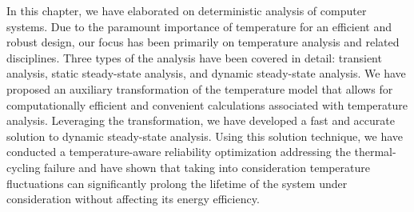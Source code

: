 In this chapter, we have elaborated on deterministic analysis of computer
systems. Due to the paramount importance of temperature for an efficient and
robust design, our focus has been primarily on temperature analysis and related
disciplines. Three types of the analysis have been covered in detail: transient
analysis, static steady-state analysis, and dynamic steady-state analysis. We
have proposed an auxiliary transformation of the temperature model that allows
for computationally efficient and convenient calculations associated with
temperature analysis. Leveraging the transformation, we have developed a fast
and accurate solution to dynamic steady-state analysis. Using this solution
technique, we have conducted a temperature-aware reliability optimization
addressing the thermal-cycling failure and have shown that taking into
consideration temperature fluctuations can significantly prolong the lifetime of
the system under consideration without affecting its energy efficiency.
